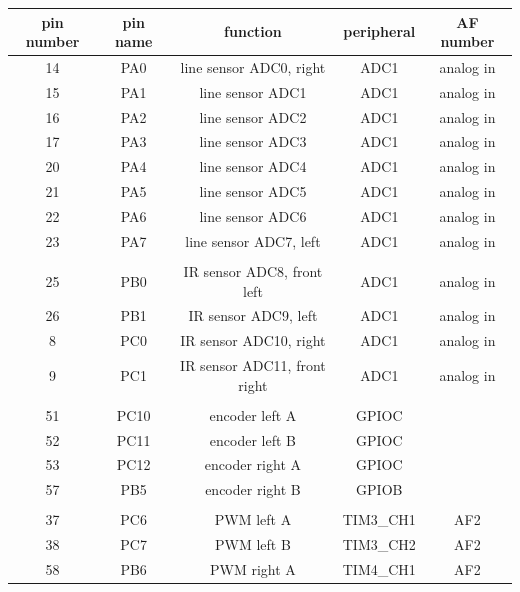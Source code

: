 \documentclass[12pt,twoside,onecolumn,openany,extrafontsizes,dvipsnames]{memoir}
\begin{document}
        \begin{table}[h!]
            \centering
                \begin{tabular}{||c c c c c||} 
                \hline
                pin number & pin name & function & peripheral & AF number \\
                \hline\hline
                    14 & PA0 & line sensor ADC0, right & ADC1 & analog in \\ 
                    15 & PA1 & line sensor ADC1 & ADC1 & analog in \\ 
                    16 & PA2 & line sensor ADC2 & ADC1 & analog in \\ 
                    17 & PA3 & line sensor ADC3 & ADC1 & analog in \\ 
                    20 & PA4 & line sensor ADC4 & ADC1 & analog in \\ 
                    21 & PA5 & line sensor ADC5 & ADC1 & analog in \\ 
                    22 & PA6 & line sensor ADC6 & ADC1 & analog in \\ 
                    23 & PA7 & line sensor ADC7, left & ADC1 & analog in \\ 
                    & & & & \\
                    25 & PB0 & IR sensor ADC8, front left  & ADC1 & analog in \\ 
                    26 & PB1 & IR sensor ADC9, left & ADC1 & analog in \\ 
                    8 & PC0 & IR sensor ADC10, right & ADC1 & analog in \\ 
                    9 & PC1 & IR sensor ADC11, front right & ADC1 & analog in \\ 
                    & & & & \\
                    51 & PC10 & encoder left A  & GPIOC &  \\ 
                    52 & PC11 & encoder left B  & GPIOC &  \\ 
                    53 & PC12 & encoder right A  & GPIOC &  \\ 
                    57 & PB5  & encoder right B  & GPIOB &  \\ 
                    & & & & \\
                    37 & PC6 & PWM left A   & TIM3\_CH1 & AF2 \\     
                    38 & PC7 & PWM left B   & TIM3\_CH2 & AF2 \\ 
                    58 & PB6 & PWM right A  & TIM4\_CH1 & AF2 \\ 

\end{tabular}
\end{table}
\end{document}
